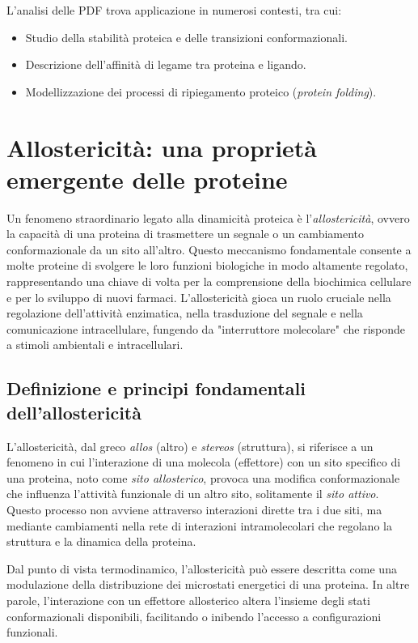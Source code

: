 \documentclass[Lau,binding=0.6cm,oneside,noexaminfo]{sapthesis}
\begin{document}
L'analisi delle PDF trova applicazione in numerosi contesti, tra cui:
\begin{itemize}
    \item Studio della stabilità proteica e delle transizioni conformazionali.
    \item Descrizione dell'affinità di legame tra proteina e ligando.
    \item Modellizzazione dei processi di ripiegamento proteico (\emph{protein folding}).
\end{itemize}

\section*{Allostericità: una proprietà emergente delle proteine}

Un fenomeno straordinario legato alla dinamicità proteica è l’\emph{allostericità}, ovvero la capacità di una proteina di trasmettere un segnale o un cambiamento conformazionale da un sito all’altro. Questo meccanismo fondamentale consente a molte proteine di svolgere le loro funzioni biologiche in modo altamente regolato, rappresentando una chiave di volta per la comprensione della biochimica cellulare e per lo sviluppo di nuovi farmaci. L’allostericità gioca un ruolo cruciale nella regolazione dell’attività enzimatica, nella trasduzione del segnale e nella comunicazione intracellulare, fungendo da "interruttore molecolare" che risponde a stimoli ambientali e intracellulari.

\subsection*{Definizione e principi fondamentali dell’allostericità}

L’allostericità, dal greco \emph{allos} (altro) e \emph{stereos} (struttura), si riferisce a un fenomeno in cui l'interazione di una molecola (effettore) con un sito specifico di una proteina, noto come \emph{sito allosterico}, provoca una modifica conformazionale che influenza l'attività funzionale di un altro sito, solitamente il \emph{sito attivo}. Questo processo non avviene attraverso interazioni dirette tra i due siti, ma mediante cambiamenti nella rete di interazioni intramolecolari che regolano la struttura e la dinamica della proteina.

Dal punto di vista termodinamico, l’allostericità può essere descritta come una modulazione della distribuzione dei microstati energetici di una proteina. In altre parole, l’interazione con un effettore allosterico altera l’insieme degli stati conformazionali disponibili, facilitando o inibendo l’accesso a configurazioni funzionali.
\end{document}
